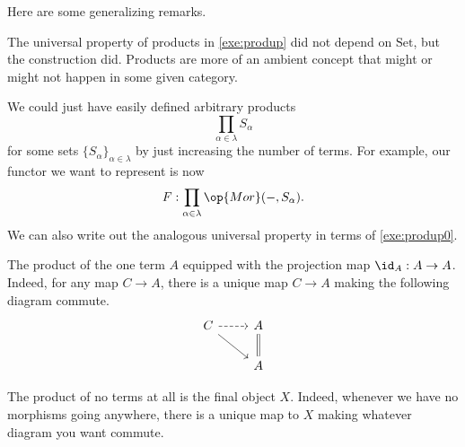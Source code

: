 \documentclass[../notes.tex]{subfiles}
\begin{document}
Here are some generalizing remarks.
\begin{remark}
	The universal property of products in \autoref{exe:produp} did not depend on $\mathrm{Set}$, but the construction did. Products are more of an ambient concept that might or might not happen in some given category.
\end{remark}
\begin{remark}
	We could just have easily defined arbitrary products
	\[\prod_{\alpha\in\lambda}S_\alpha\]
	for some sets $\{S_\alpha\}_{\alpha\in\lambda}$ by just increasing the number of terms. For example, our functor we want to represent is now
	\[F:\prod_{\alpha\in\lambda}\op{Mor}(-,S_\alpha).\]
	We can also write out the analogous universal property in terms of \autoref{exe:produp0}.
\end{remark}
\begin{example}
	The product of the one term $A$ equipped with the projection map $\id_A:A\to A$. Indeed, for any map $C\to A$, there is a unique map $C\to A$ making the following diagram commute.
	\[\begin{tikzcd}
		C & A \\
		& A
		\arrow[Rightarrow, no head, from=1-2, to=2-2]
		\arrow[from=1-1, to=2-2]
		\arrow[dashed, from=1-1, to=1-2]
	\end{tikzcd}\]
\end{example}
\begin{example}
	The product of no terms at all is the final object $X$. Indeed, whenever we have no morphisms going anywhere, there is a unique map to $X$ making whatever diagram you want commute.
\end{example}
\end{document}
